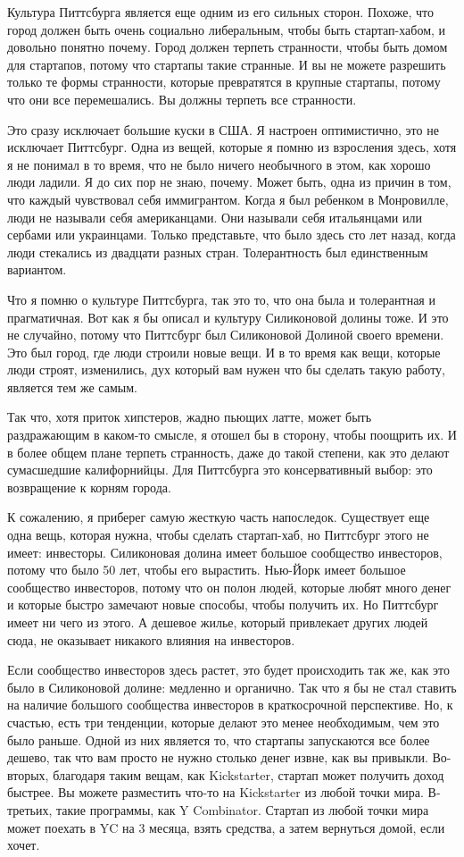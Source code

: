 \documentclass[ebook,12pt,oneside,openany]{memoir}
\begin{document}
Культура Питтсбурга является еще одним из его сильных сторон. Похоже,
что город должен быть очень социально либеральным, чтобы быть
стартап-хабом, и довольно понятно почему. Город должен терпеть
странности, чтобы быть домом для стартапов, потому что стартапы такие
странные. И вы не можете разрешить только те формы странности, которые
превратятся в крупные стартапы, потому что они все перемешались. Вы
должны терпеть все странности.

Это сразу исключает большие куски в США. Я настроен оптимистично, это
не исключает Питтсбург. Одна из вещей, которые я помню из взросления
здесь, хотя я не понимал в то время, что не было ничего необычного в
этом, как хорошо люди ладили. Я до сих пор не знаю, почему. Может
быть, одна из причин в том, что каждый чувствовал себя иммигрантом.
Когда я был ребенком в Монровилле, люди не называли себя американцами.
Они называли себя итальянцами или сербами или украинцами. Только
представьте, что было здесь сто лет назад, когда люди стекались из
двадцати разных стран. Толерантность был единственным вариантом.

Что я помню о культуре Питтсбурга, так это то, что она была и
толерантная и прагматичная. Вот как я бы описал и культуру Силиконовой
долины тоже. И это не случайно, потому что Питтсбург был Силиконовой
Долиной своего времени. Это был город, где люди строили новые вещи. И
в то время как вещи, которые люди строят, изменились, дух который вам
нужен что бы сделать такую работу, является тем же самым.

Так что, хотя приток хипстеров, жадно пьющих латте, может быть
раздражающим в каком-то смысле, я отошел бы в сторону, чтобы поощрить
их. И в более общем плане терпеть странность, даже до такой степени,
как это делают сумасшедшие калифорнийцы. Для Питтсбурга это
консервативный выбор: это возвращение к корням города.

К сожалению, я приберег самую жесткую часть напоследок. Существует еще
одна вещь, которая нужна, чтобы сделать стартап-хаб, но Питтсбург
этого не имеет: инвесторы. Силиконовая долина имеет большое сообщество
инвесторов, потому что было 50 лет, чтобы его вырастить. Нью-Йорк
имеет большое сообщество инвесторов, потому что он полон людей,
которые любят много денег и которые быстро замечают новые способы,
чтобы получить их. Но Питтсбург имеет ни чего из этого. А дешевое
жилье, который привлекает других людей сюда, не оказывает никакого
влияния на инвесторов.

Если сообщество инвесторов здесь растет, это будет происходить так же,
как это было в Силиконовой долине: медленно и органично. Так что я бы
не стал ставить на наличие большого сообщества инвесторов в
краткосрочной перспективе. Но, к счастью, есть три тенденции, которые
делают это менее необходимым, чем это было раньше. Одной из них
является то, что стартапы запускаются все более дешево, так что вам
просто не нужно столько денег извне, как вы привыкли. Во-вторых,
благодаря таким вещам, как Kickstarter, стартап может получить доход
быстрее. Вы можете разместить что-то на Kickstarter из любой точки
мира. В-третьих, такие программы, как Y Combinator. Стартап из любой
точки мира может поехать в YC на 3 месяца, взять средства, а затем
вернуться домой, если хочет.
\end{document}
